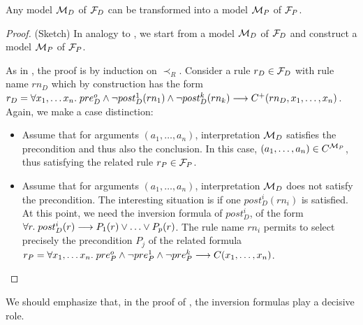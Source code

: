 \begin{lemma}\label{lemma:md_to_mp}
  Any model ${\cal M}_D$ of ${\cal F}_D$ can be transformed into a model
  ${\cal M}_P$ of ${\cal F}_P$.
\end{lemma}

\begin{proof} (Sketch)
  In analogy to , we start from a model ${\cal M}_D$
  of ${\cal F}_D$ and construct a model ${\cal M}_P$ of ${\cal F}_P$. 

  As in , the proof is by induction on $\prec_R$.
  Consider a rule $r_D \in {\cal F}_D$ with rule
  name $rn_D$ which by construction has the form
  $r_D = \forall x_1, \dots x_n.\; pre_D^o \land \lnot post_D^1(rn_1) \land \lnot post_D^k(rn_k)
  \longrightarrow C^+(rn_D, x_1, \dots, x_n)$. Again, we make a case distinction:
  \begin{itemize}
  \item Assume that for arguments $(a_1, \dots, a_n)$, interpretation
    ${\cal M}_D$ satisfies the precondition and thus also the conclusion. In
    this case, $(a_1, \dots, a_n)\in C^{{\cal M}_P}$, thus satisfying the
    related rule $r_P \in {\cal F}_P$.
  \item Assume that for arguments $(a_1, \dots, a_n)$, interpretation
    ${\cal M}_D$ does not satisfy the precondition. The interesting situation
    is if one $post_D^i(rn_i)$ is satisfied. At this point, we need the
    inversion formula of $post_D^i$, of the form
    $\forall r.\; post_D^i(r) \IMPL P_1(r) \OR \dots \OR P_p(r)$. The rule
    name $rn_i$ permits to select precisely the precondition $P_j$ of the
    related formula
    $r_P = \forall x_1, \dots x_n.\; pre_P^o \land \lnot pre_P^1 \land \lnot
    pre_P^k \longrightarrow C(x_1, \dots, x_n)$.
  \end{itemize}
\end{proof}
We should emphasize that, in the proof of , the
inversion formulas play a decisive role.




